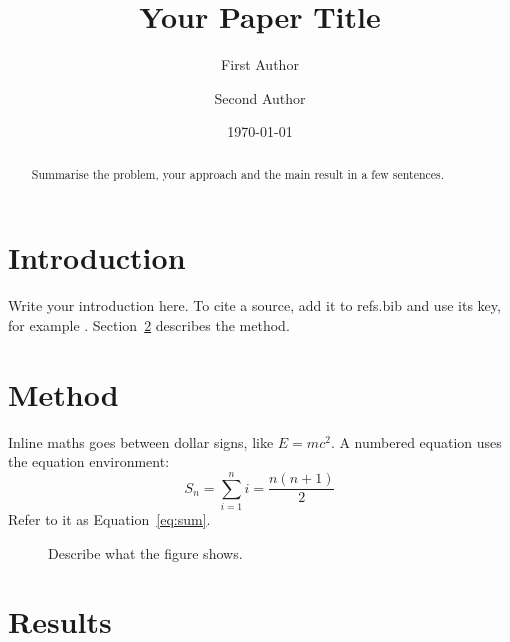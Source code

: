 \documentclass[11pt]{article}
\title{Your Paper Title}
\author{First Author \and Second Author}
\date{\today}
\begin{document}
\maketitle

\begin{abstract}
Summarise the problem, your approach and the main result in a few sentences.
\end{abstract}

\section{Introduction}\label{sec:intro}

Write your introduction here. To cite a source, add it to refs.bib and use its
key, for example \cite{knuth1984}. Section~\ref{sec:method} describes the method.

\section{Method}\label{sec:method}

Inline maths goes between dollar signs, like $E = mc^2$. A numbered equation
uses the equation environment:
\begin{equation}\label{eq:sum}
  S_n = \sum_{i=1}^{n} i = \frac{n(n+1)}{2}
\end{equation}
Refer to it as Equation~\eqref{eq:sum}.

\begin{figure}[t]
  \centering
  \caption{Describe what the figure shows.}\label{fig:example}
\end{figure}

\section{Results}
\end{document}
